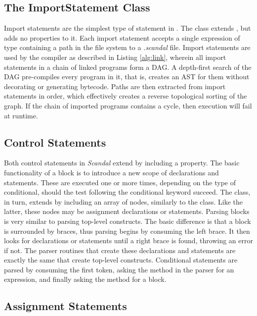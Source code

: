 \subsection{The ImportStatement Class}

Import statements are the simplest type of statement in . The  class extends , but adds no properties to it. Each import statement accepts a single expression of type  containing a path in the file system to a \emph{.scandal} file. Import statements are used by the compiler as described in Listing \ref{alg:link}, wherein all import statements in a chain of linked programs form a DAG. A depth-first search of the DAG pre-compiles every program in it, that is, creates an AST for them without decorating or generating bytecode. Paths are then extracted from import statements in order, which effectively creates a reverse topological sorting of the graph. If the chain of imported programs contains a cycle, then execution will fail at runtime.

\subsection{Control Statements}

Both control statements in \emph{Scandal} extend  by including a  property. The basic functionality of a block is to introduce a new scope of declarations and statements. These are executed one or more times, depending on the type of conditional, should the test following the conditional keyword succeed. The  class, in turn, extends  by including an array of nodes, similarly to the  class. Like the latter, these nodes may be assignment declarations or statements. Parsing blocks is very similar to parsing top-level constructs. The basic difference is that a block is surrounded by braces, thus parsing begins by consuming the left brace. It then looks for declarations or statements until a right brace is found, throwing an error if not. The parser routines that create these declarations and statements are exactly the same that create top-level constructs. Conditional statements are parsed by consuming the first token, asking the  method in the parser for an expression, and finally asking the  method for a block.

\subsection{Assignment Statements}

